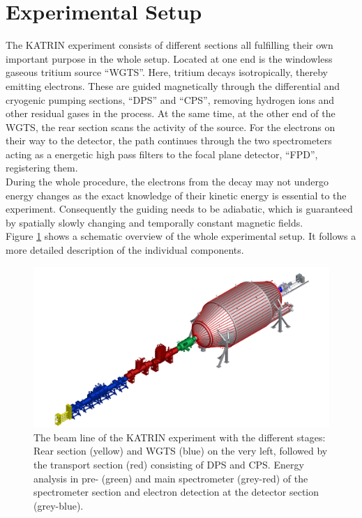       \section{Experimental Setup}
      \label{ch:The KATRIN experiment:sec:Experimental setup}
      The KATRIN experiment consists of different sections all fulfilling their own important purpose in the whole setup. Located at one end is the windowless gaseous tritium source ``WGTS''. Here, tritium decays isotropically, thereby emitting electrons. These are guided magnetically through the differential and cryogenic pumping sections, ``DPS'' and ``CPS'', removing hydrogen ions and other residual gases in the process. At the same time, at the other end of the WGTS, the rear section scans the activity of the source. For the electrons on their way to the detector, the path continues through the two spectrometers acting as a energetic high pass filters to the focal plane detector, ``FPD'', registering them.\\
      During the whole procedure, the electrons from the decay may not undergo energy changes as the exact knowledge of their kinetic energy is essential to the experiment. Consequently the guiding needs to be adiabatic, which is guaranteed by spatially slowly changing and temporally constant magnetic fields.\\
      Figure \ref{fig:beamLine} shows a schematic overview of the whole experimental setup. It follows a more detailed description of the individual components.
      
      \begin{figure}
			
      		\includegraphics[width = \textwidth]{graphics/katrinExperiment/beamLineHD.jpg}

      	\caption[KATRIN Beam Line]{The beam line of the KATRIN experiment with the different stages: Rear section (yellow) and WGTS (blue) on the very left, followed by the transport section (red) consisting of DPS and CPS. Energy analysis in pre- (green) and main spectrometer (grey-red) of the spectrometer section and electron detection at the detector section (grey-blue).}
      	\label{fig:beamLine}
      \end{figure}

